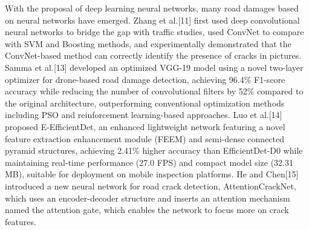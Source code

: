 \documentclass[sensors,article,submit,moreauthors]{Definitions/mdpi}
\begin{document}
    With the proposal of deep learning neural networks, many road damages based on neural networks have emerged. Zhang et al.[11] first used deep convolutional neural networks to bridge the gap with traffic studies, used ConvNet to compare with SVM and Boosting methods, and experimentally demonstrated that the ConvNet-based method can correctly identify the presence of cracks in pictures.
    Samma et al.[13]\citep{samma2021evolving} developed an optimized VGG-19 model using a novel two-layer optimizer for drone-based road damage detection, achieving 96.4\% F1-score accuracy while reducing the number of convolutional filters by 52\% compared to the original architecture, outperforming conventional optimization methods including PSO and reinforcement learning-based approaches. Luo et al.[14]\citep{luo2023enhanced} proposed E-EfficientDet, an enhanced lightweight network featuring a novel feature extraction enhancement module (FEEM) and semi-dense connected pyramid structures, achieving 2.41\% higher accuracy than EfficientDet-D0 while maintaining real-time performance (27.0 FPS) and compact model size (32.31 MB), suitable for deployment on mobile inspection platforms. He and Chen[15]\citep{chen2022novel} introduced a new neural network for road crack detection, AttentionCrackNet, which uses an encoder-decoder structure and inserts an attention mechanism named the attention gate, which enables the network to focus more on crack features.
\end{document}
